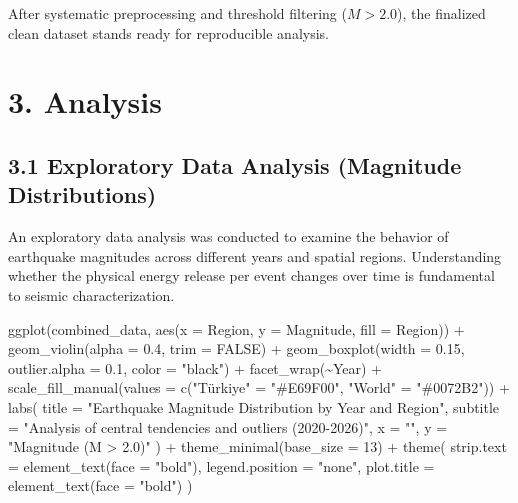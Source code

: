 \documentclass[
  11pt,
  a4paper,
  DIV=11,
  numbers=noendperiod]{scrartcl}
\newenvironment{Shaded}{\begin{snugshade}}{\end{snugshade}}
\newcommand{\AttributeTok}[1]{\textcolor[rgb]{0.40,0.45,0.13}{#1}}
\newcommand{\ConstantTok}[1]{\textcolor[rgb]{0.56,0.35,0.01}{#1}}
\newcommand{\DecValTok}[1]{\textcolor[rgb]{0.68,0.00,0.00}{#1}}
\newcommand{\FloatTok}[1]{\textcolor[rgb]{0.68,0.00,0.00}{#1}}
\newcommand{\FunctionTok}[1]{\textcolor[rgb]{0.28,0.35,0.67}{#1}}
\newcommand{\NormalTok}[1]{\textcolor[rgb]{0.00,0.23,0.31}{#1}}
\newcommand{\OtherTok}[1]{\textcolor[rgb]{0.00,0.23,0.31}{#1}}
\newcommand{\SpecialCharTok}[1]{\textcolor[rgb]{0.37,0.37,0.37}{#1}}
\newcommand{\StringTok}[1]{\textcolor[rgb]{0.13,0.47,0.30}{#1}}
\begin{document}
After systematic preprocessing and threshold filtering (\(M > 2.0\)),
the finalized clean dataset stands ready for reproducible analysis.

\section{3. Analysis}\label{analysis}

\subsection{3.1 Exploratory Data Analysis (Magnitude
Distributions)}\label{exploratory-data-analysis-magnitude-distributions}

An exploratory data analysis was conducted to examine the behavior of
earthquake magnitudes across different years and spatial regions.
Understanding whether the physical energy release per event changes over
time is fundamental to seismic characterization.

\begin{Shaded}
\begin{Highlighting}[]
\FunctionTok{ggplot}\NormalTok{(combined\_data, }\FunctionTok{aes}\NormalTok{(}\AttributeTok{x =}\NormalTok{ Region, }\AttributeTok{y =}\NormalTok{ Magnitude, }\AttributeTok{fill =}\NormalTok{ Region)) }\SpecialCharTok{+}
  \FunctionTok{geom\_violin}\NormalTok{(}\AttributeTok{alpha =} \FloatTok{0.4}\NormalTok{, }\AttributeTok{trim =} \ConstantTok{FALSE}\NormalTok{) }\SpecialCharTok{+}
  \FunctionTok{geom\_boxplot}\NormalTok{(}\AttributeTok{width =} \FloatTok{0.15}\NormalTok{, }\AttributeTok{outlier.alpha =} \FloatTok{0.1}\NormalTok{, }\AttributeTok{color =} \StringTok{"black"}\NormalTok{) }\SpecialCharTok{+}
  \FunctionTok{facet\_wrap}\NormalTok{(}\SpecialCharTok{\textasciitilde{}}\NormalTok{Year) }\SpecialCharTok{+}
  \FunctionTok{scale\_fill\_manual}\NormalTok{(}\AttributeTok{values =} \FunctionTok{c}\NormalTok{(}\StringTok{"Türkiye"} \OtherTok{=} \StringTok{"\#E69F00"}\NormalTok{, }\StringTok{"World"} \OtherTok{=} \StringTok{"\#0072B2"}\NormalTok{)) }\SpecialCharTok{+}
  \FunctionTok{labs}\NormalTok{(}
    \AttributeTok{title =} \StringTok{"Earthquake Magnitude Distribution by Year and Region"}\NormalTok{,}
    \AttributeTok{subtitle =} \StringTok{"Analysis of central tendencies and outliers (2020{-}2026)"}\NormalTok{,}
    \AttributeTok{x =} \StringTok{""}\NormalTok{,}
    \AttributeTok{y =} \StringTok{"Magnitude (M \textgreater{} 2.0)"}
\NormalTok{  ) }\SpecialCharTok{+}
  \FunctionTok{theme\_minimal}\NormalTok{(}\AttributeTok{base\_size =} \DecValTok{13}\NormalTok{) }\SpecialCharTok{+}
  \FunctionTok{theme}\NormalTok{(}
    \AttributeTok{strip.text =} \FunctionTok{element\_text}\NormalTok{(}\AttributeTok{face =} \StringTok{"bold"}\NormalTok{),}
    \AttributeTok{legend.position =} \StringTok{"none"}\NormalTok{,}
    \AttributeTok{plot.title =} \FunctionTok{element\_text}\NormalTok{(}\AttributeTok{face =} \StringTok{"bold"}\NormalTok{)}
\NormalTok{  )}
\end{Highlighting}
\end{Shaded}
\end{document}
